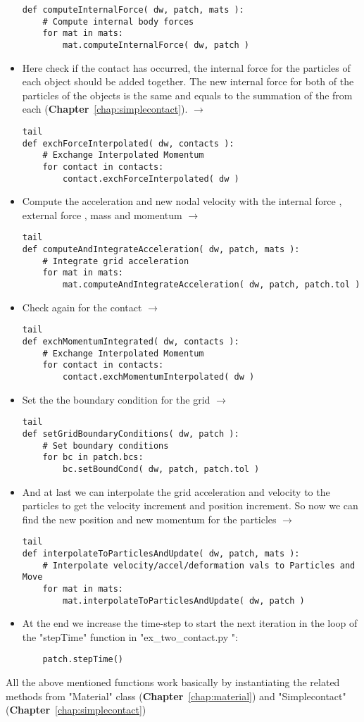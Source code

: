 \documentclass[11pt,fleqn]{book} %
\begin{document}
\begin{itemize}
\begin{lstlisting}
def computeInternalForce( dw, patch, mats ):
    # Compute internal body forces
    for mat in mats:
        mat.computeInternalForce( dw, patch )
\end{lstlisting}
\item Here check if the contact has occurred, the internal force for the particles of each object should be added together. The new internal force for both of the particles of the objects is the same and equals to the summation of the  from each (\textbf{Chapter}~\ref{chap:simplecontact}).  $\rightarrow$ 
\begin{lstlisting}tail
def exchForceInterpolated( dw, contacts ):
    # Exchange Interpolated Momentum
    for contact in contacts:
        contact.exchForceInterpolated( dw )
\end{lstlisting}
\item Compute the acceleration and new nodal velocity with the internal force , external force , mass  and momentum  $\rightarrow$ 
\begin{lstlisting}tail
def computeAndIntegrateAcceleration( dw, patch, mats ):
    # Integrate grid acceleration
    for mat in mats:
        mat.computeAndIntegrateAcceleration( dw, patch, patch.tol )  
\end{lstlisting}
\item Check again for the contact $\rightarrow$ 
\begin{lstlisting}tail
def exchMomentumIntegrated( dw, contacts ):
    # Exchange Interpolated Momentum
    for contact in contacts:
        contact.exchMomentumInterpolated( dw )
\end{lstlisting}
\item Set the the boundary condition for the grid $\rightarrow$ 
\begin{lstlisting}tail
def setGridBoundaryConditions( dw, patch ):
    # Set boundary conditions
    for bc in patch.bcs:
        bc.setBoundCond( dw, patch, patch.tol )
\end{lstlisting}
\item And at last we can interpolate the grid acceleration and velocity to the particles to get the velocity increment and position increment. So now we can find the new position and new momentum for the particles $\rightarrow$ 
\begin{lstlisting}tail
def interpolateToParticlesAndUpdate( dw, patch, mats ):
    # Interpolate velocity/accel/deformation vals to Particles and Move
    for mat in mats:
        mat.interpolateToParticlesAndUpdate( dw, patch )
\end{lstlisting}
\item At the end we increase the time-step to start the next iteration in the  loop of the "stepTime" function in "ex\_two\_contact.py ":
\begin{lstlisting}	
	patch.stepTime() 
\end{lstlisting}
\end{itemize}

All the above mentioned functions work basically by instantiating the related methods from "Material" class (\textbf{Chapter}~\ref{chap:material}) and "Simplecontact" (\textbf{Chapter}~\ref{chap:simplecontact})
 
  
\end{document}
